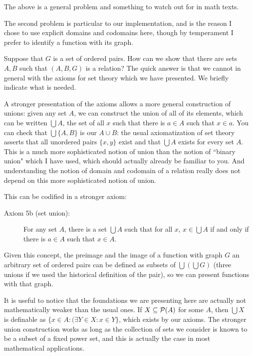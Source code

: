 \documentclass[12pt]{article}
\begin{document}
\begin{description}
The above is a general problem and something to watch out for in math texts.

The second problem is particular to our implementation, and is the reason I chose to use explicit domains and codomains here, though by temperament I prefer to identify a function with its graph.

Suppose that $G$ is a set of ordered pairs.  How can we show that there are sets $A,B$ such that $(A,B,G)$ is a relation?
The quick answer is that we cannot in general with the axioms for set theory which we have presented.  We briefly indicate what is needed.

A stronger presentation of the axioms allows a more general construction of unions:  given any set $A$, we can construct the union of all of its elements, which can be written $\bigcup A$, the set of all $x$ such that there is $a \in A$ such
that $x \in a$.  You can check that $\bigcup \{A,B\}$ is our $A \cup B$:  the usual axiomatization of set theory 
asserts that all unordered pairs $\{x,y\}$ exist and that $\bigcup A$ exists for every set $A$.  This is a much more sophisticated notion of union than the notion of ``binary union" which I have used, which should actually already be familiar to you.  And understanding the notion of domain and codomain of a relation really does not depend on this more sophisticated notion of union.

This can be codified in a stronger axiom:

\begin{description}

\item[Axiom 5b (set union):]  For any set $A$, there is a set $\bigcup A$ such that for all $x$, $x \in \bigcup A$ if and only if there is $a \in A$ such that $x \in A$.

\end{description}

Given this concept, the preimage and the image of a function with graph $G$ an arbitrary set of ordered pairs can be defined as subsets of $\bigcup(\bigcup G)$ (three unions if we used the historical definition of the pair), so we can present functions with that graph.  

It is useful to notice that the foundations we are presenting here are actually not mathematically weaker than the usual ones.  If $X \subseteq {\cal P}(A)$ for some $A$, then $\bigcup X$ is definable as $\{x \in A:(\exists Y \in X:x \in Y\}$, which exists by our axioms.  The stronger union construction works as long as the collection of sets we consider is known to be a subset of a fixed power set, and this is actually the case in most mathematical applications.


\end{description}
\end{document}
